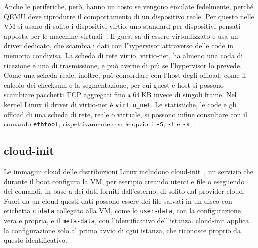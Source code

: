 Anche le periferiche, però, hanno un costo se vengono emulate fedelmente, perché QEMU deve riprodurre il comportamento di un dispositivo reale. Per questo nelle VM si usano di solito i dispositivi virtio, uno standard per dispositivi pensati apposta per le macchine virtuali~\cite{virtio-spec}. Il guest sa di essere virtualizzato e usa un driver dedicato, che scambia i dati con l'hypervisor attraverso delle code in memoria condivisa. La scheda di rete virtio, virtio-net, ha almeno una coda di ricezione e una di trasmissione, e può averne di più se l'hypervisor lo prevede. Come una scheda reale, inoltre, può concordare con l'host degli offload, come il calcolo dei checksum e la segmentazione, per cui guest e host si possono scambiare pacchetti TCP aggregati fino a 64\,KB invece di singoli frame. Nel kernel Linux il driver di virtio-net è \texttt{virtio\_net}. Le statistiche, le code e gli offload di una scheda di rete, reale o virtuale, si possono infine consultare con il comando \texttt{ethtool}, rispettivamente con le opzioni \texttt{-S}, \texttt{-l} e \texttt{-k}~\cite{man-ethtool}.

\subsection{cloud-init}

Le immagini cloud delle distribuzioni Linux includono cloud-init~\cite{cloud-init}, un servizio che durante il boot configura la VM, per esempio creando utenti e file o eseguendo dei comandi, in base a dei dati forniti dall'esterno, di solito dal provider cloud. Fuori da un cloud questi dati possono essere dei file salvati in un disco con etichetta \texttt{cidata} collegato alla VM, come lo \texttt{user-data}, con la configurazione vera e propria, e il \texttt{meta-data}, con l'identificativo dell'istanza. cloud-init applica la configurazione solo al primo avvio di ogni istanza, che riconosce proprio da questo identificativo.
